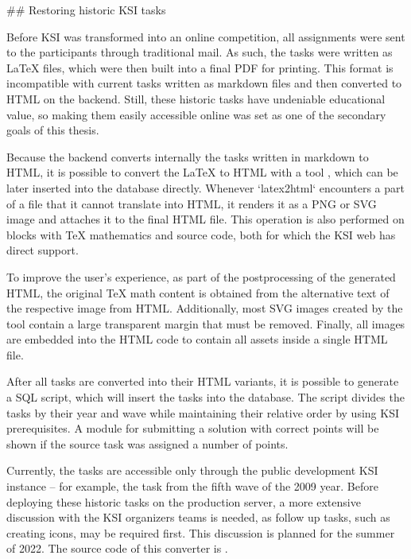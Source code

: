 \documentclass[
  digital, %
  oneside, %
  lof,     %
  nolot,     %
]{fithesis4}
\begin{document}
{## Restoring historic \acrshort{KSI} tasks

Before \acrshort{KSI} was transformed into an online competition, all assignments were sent to the participants through traditional mail. As such, the tasks were written as \LaTeX{} files, which were then built into a final \acrshort{PDF} for printing. This format is incompatible with current tasks written as markdown files and then converted to \acrshort{HTML} on the backend. Still, these historic tasks have undeniable educational value, so making them easily accessible online	was set as one of the secondary goals of this thesis.

Because the backend converts internally the tasks written in markdown to \acrshort{HTML}, it is possible to convert the \LaTeX{} to \acrshort{HTML} with a tool , which can be later inserted into the database directly. Whenever `latex2html` encounters a part of a file that it cannot translate into \acrshort{HTML}, it renders it as a \acrshort{PNG} or \acrshort{SVG} image and attaches it to the final \acrshort{HTML} file. This operation is also performed on blocks with TeX mathematics and source code, both for which the \acrshort{KSI} web has direct support.

To improve the user's experience, as part of the postprocessing of the generated \acrshort{HTML}, the original TeX math content is obtained from the alternative text of the respective image from \acrshort{HTML}. Additionally, most \acrshort{SVG} images created by the tool contain a large transparent margin that must be removed. Finally, all images are embedded into the \acrshort{HTML} code to contain all assets inside a single \acrshort{HTML} file.

After all tasks are converted into their \acrshort{HTML} variants, it is possible to generate a SQL script, which will insert the tasks into the database. The script divides the tasks by their year and wave while maintaining their relative order by using \acrshort{KSI} prerequisites. A module for submitting a solution with correct points will be shown if the source task was assigned a number of points.

Currently, the tasks are accessible only through the public development \acrshort{KSI} instance -- for example, the task  from the fifth wave of the 2009 year. Before deploying these historic tasks on the production server, a more extensive discussion with the \acrshort{KSI} organizers teams is needed, as follow up tasks, such as creating icons, may be required first. This discussion is planned for the summer of 2022. The source code of this converter is .

}
\end{document}
